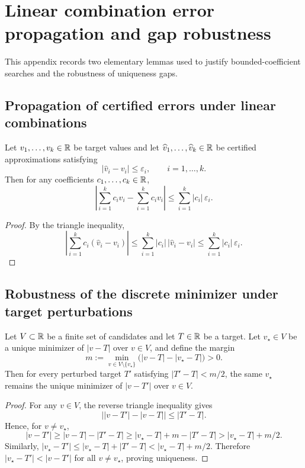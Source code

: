 
\section{Linear combination error propagation and gap robustness}
\label{app:linear_combination_gap}

This appendix records two elementary lemmas used to justify bounded-coefficient searches and the robustness of uniqueness gaps.

\subsection{Propagation of certified errors under linear combinations}
\label{app:linear_combination_error}

\begin{lemma}
\label{lem:linear_combination_error}
Let $v_1,\dots,v_k\in\mathbb{R}$ be target values and let $\widehat v_1,\dots,\widehat v_k\in\mathbb{R}$ be certified approximations satisfying
\[
|\widehat v_i-v_i|\le \varepsilon_i,\qquad i=1,\dots,k.
\]
Then for any coefficients $c_1,\dots,c_k\in\mathbb{R}$,
\[
\left|\sum_{i=1}^k c_i\widehat v_i-\sum_{i=1}^k c_i v_i\right|
\le
\sum_{i=1}^k |c_i|\,\varepsilon_i.
\]
\end{lemma}

\begin{proof}
By the triangle inequality,
\[
\left|\sum_{i=1}^k c_i(\widehat v_i-v_i)\right|
\le
\sum_{i=1}^k |c_i|\,|\widehat v_i-v_i|
\le
\sum_{i=1}^k |c_i|\,\varepsilon_i.
\]
\end{proof}

\subsection{Robustness of the discrete minimizer under target perturbations}
\label{app:gap_robustness}

\begin{lemma}
\label{lem:gap_robustness}
Let $V\subset\mathbb{R}$ be a finite set of candidates and let $T\in\mathbb{R}$ be a target.
Let $v_\star\in V$ be a unique minimizer of $|v-T|$ over $v\in V$, and define the margin
\[
m:=\min_{v\in V\setminus\{v_\star\}}\Big(|v-T|-|v_\star-T|\Big)>0.
\]
Then for every perturbed target $T'$ satisfying $|T'-T|<m/2$, the same $v_\star$ remains the unique minimizer of $|v-T'|$ over $v\in V$.
\end{lemma}

\begin{proof}
For any $v\in V$, the reverse triangle inequality gives
\[
\big||v-T'|-|v-T|\big|\le |T'-T|.
\]
Hence, for $v\neq v_\star$,
\[
|v-T'|
\ge
|v-T|-|T'-T|
\ge
|v_\star-T|+m-|T'-T|
>
|v_\star-T|+m/2.
\]
Similarly, $|v_\star-T'|\le |v_\star-T|+|T'-T|<|v_\star-T|+m/2$.
Therefore $|v_\star-T'|<|v-T'|$ for all $v\neq v_\star$, proving uniqueness.
\end{proof}


